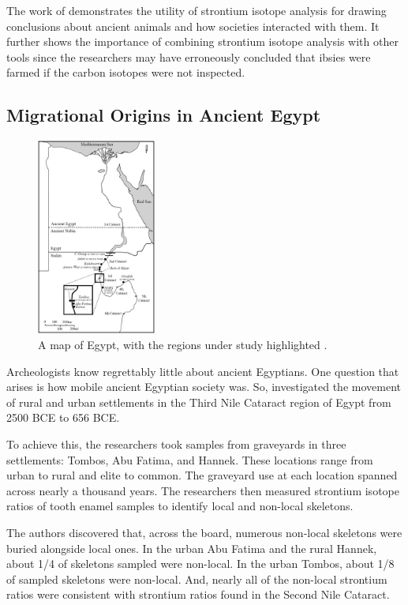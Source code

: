 \documentclass[a4paper, 12pt]{article}
\begin{document}
The work of \cite{linglin2020} demonstrates the utility of strontium isotope analysis
for drawing conclusions about ancient animals and how societies interacted with them.
It further shows the importance of combining strontium isotope analysis with other
tools since the researchers may have erroneously concluded that ibsies were farmed
if the carbon isotopes were not inspected.


\subsection{Migrational Origins in Ancient Egypt}
\begin{figure}[ht]
    \centering
    \includegraphics[width=0.35\textwidth]{egypt_regions.jpg}
    \caption{A map of Egypt, with the regions under study highlighted \citep{schrader2019}. }
    \label{fig:egypt_regions}
\end{figure}

Archeologists know regrettably little about ancient Egyptians.
One question that arises is how mobile ancient Egyptian society was.
So, \cite{schrader2019} investigated the movement of rural and urban settlements
in the Third Nile Cataract region of Egypt from 2500 BCE to 656 BCE.

To achieve this, the researchers took samples from graveyards in three settlements:
Tombos, Abu Fatima, and Hannek. These locations range from urban to rural and elite
to common. The
graveyard use at each location spanned across nearly a thousand years. The researchers
then measured strontium isotope ratios of tooth enamel samples to
identify local and non-local skeletons.

The authors discovered that, across the board, numerous non-local skeletons were buried
alongside local ones. In the urban Abu Fatima and the rural Hannek, about 1/4 of
skeletons sampled were non-local. In the urban Tombos, about 1/8 of sampled
skeletons were non-local. And, nearly all of the
non-local strontium ratios were consistent with strontium ratios found in the Second
Nile Cataract.
\end{document}
